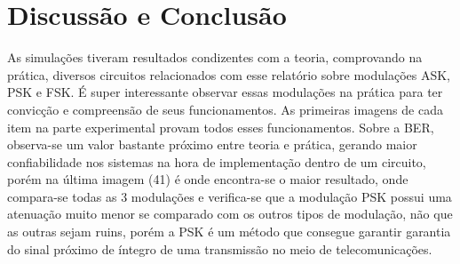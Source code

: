 \newpage
\section{Discussão e Conclusão}
As simulações tiveram resultados condizentes com a teoria, comprovando na prática, diversos circuitos relacionados com esse relatório sobre modulações ASK, PSK e FSK. É super interessante observar essas modulações na prática para ter convicção e compreensão de seus funcionamentos. As primeiras imagens de cada item na parte experimental provam todos esses funcionamentos.
Sobre a BER, observa-se um valor bastante próximo entre teoria e prática, gerando maior confiabilidade nos sistemas na hora de implementação dentro de um circuito, porém na última imagem (41) é onde encontra-se o maior resultado, onde compara-se todas as 3 modulações e verifica-se que a modulação PSK possui uma atenuação muito menor se comparado com os outros tipos de modulação, não que as outras sejam ruins, porém a PSK é um método que consegue garantir garantia do sinal próximo de íntegro de uma transmissão no meio de telecomunicações.